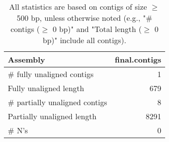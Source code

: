 \documentclass[12pt,a4paper]{article}
\begin{document}
\begin{table}[ht]
\begin{center}
\caption{All statistics are based on contigs of size $\geq$ 500 bp, unless otherwise noted (e.g., "\# contigs ($\geq$ 0 bp)" and "Total length ($\geq$ 0 bp)" include all contigs).}
\begin{tabular}{|l*{1}{|r}|}
\hline
Assembly & final.contigs \\ \hline
\# fully unaligned contigs & 1 \\ \hline
Fully unaligned length & 679 \\ \hline
\# partially unaligned contigs & 8 \\ \hline
Partially unaligned length & 8291 \\ \hline
\# N's & 0 \\ \hline
\end{tabular}
\end{center}
\end{table}
\end{document}
